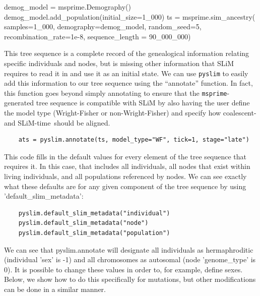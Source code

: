 \documentclass[12pt]{article}
\newcommand{\msprime}[0]{\texttt{msprime}\xspace}
\newcommand{\pyslim}[0]{\texttt{pyslim}\xspace}
\begin{document}
\begin{listing}[H]
  demog_model = msprime.Demography()
  demog_model.add_population(initial_size=1_000)
  ts = msprime.sim_ancestry(
          samples=1_000,
          demography=demog_model,
          random_seed=5,
          recombination_rate=1e-8,
          sequence_length = 90_000_000)
\end{listing}

This tree sequence is a complete record of the genealogical information relating specific individuals
and nodes, but is missing other information that  SLiM requires to read it in and use it as an initial state.
We can use \pyslim to easily add this information to our tree sequence using the ``annotate'' function.
In fact, this function goes beyond simply annotating to ensure that the \msprime-generated tree sequence
is compatible with SLiM by also having the user define the model type (Wright-Fisher or non-Wright-Fisher)
and specify how coalescent- and SLiM-time\ should be aligned.

\begin{listing}[H]
  \begin{verbatim}
    ats = pyslim.annotate(ts, model_type="WF", tick=1, stage="late")
  \end{verbatim}
\end{listing}

This code fills in the default values for every element of the tree sequence that requires it. 
In this case, that includes all individuals, all nodes that exist within living individuals, and all
populations referenced by nodes. We can see exactly what these defaults
are for any given component of the tree sequence by using 'default_slim_metadata':

\begin{listing}[H]
  \begin{verbatim}
    pyslim.default_slim_metadata("individual")
    pyslim.default_slim_metadata("node")
    pyslim.default_slim_metadata("population")
  \end{verbatim}
\end{listing}

We can see that pyslim.annotate will designate all individuals as hermaphroditic (individual 'sex' is -1) and
all chromosomes as autosomal (node 'genome_type' is 0). It is possible to change these values in order to,
for example, define sexes. Below, we show how to do this specifically for mutations, but other modifications
can be done in a similar manner.
\end{document}
